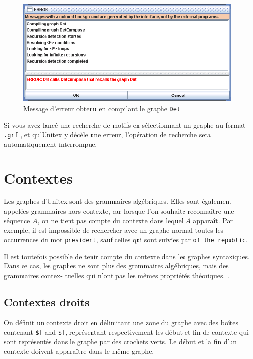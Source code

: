 \begin{figure}[!h]
\begin{center}
\includegraphics[width=15cm]{resources/img/fig6-11.png}
\caption{Message d’erreur obtenu en compilant le graphe
\texttt{Det}\label{fig-error-message}}
\end{center}
\end{figure}

\noindent Si vous avez lancé une recherche de motifs en sélectionnant un graphe au format 
\verb+.grf+ , et qu’Unitex y décèle une erreur, l’opération
de recherche sera automatiquement interrompue.


\section{Contextes}
\label{section-contexts}

Les graphes d’Unitex sont des grammaires algébriques. Elles sont également appelées
grammaires hors-contexte, car lorsque l’on souhaite reconnaître une séquence
 $A$, on ne tient pas compte du contexte dans lequel $A$ apparaît. Par exemple, il est 
 impossible de rechercher avec un graphe normal toutes les occurrences du mot \verb+president+, 
 sauf celles qui sont suivies par \verb+of the republic+.


\bigskip
\noindent Il est toutefois possible de tenir compte du contexte dans les graphes syntaxiques. Dans
ce cas, les graphes ne sont plus des grammaires algébriques, mais des grammaires contex-
tuelles qui n’ont pas les mêmes propriétés théoriques.
.

\subsection{Contextes droits}
\index{\verb+$[+}
\index{\verb+$]+}
On définit un contexte droit en délimitant une zone du graphe avec des boîtes contenant
\verb+$[+ and \verb+$]+, représentant respectivement les début et fin de contexte qui sont
représentés dans le graphe par des crochets verts. Le début et la fin d’un contexte doivent
apparaître dans le même graphe.


